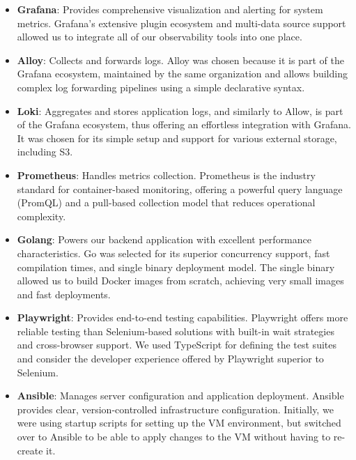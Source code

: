 \begin{itemize}
    \item \textbf{Grafana}: Provides comprehensive visualization and alerting for system metrics. Grafana's extensive plugin ecosystem and multi-data source support allowed us to integrate all of our observability tools into one place.

    \item \textbf{Alloy}: Collects and forwards logs. Alloy was chosen because it is part of the Grafana ecosystem, maintained by the same organization and allows building complex log forwarding pipelines using a simple declarative syntax.

    \item \textbf{Loki}: Aggregates and stores application logs, and similarly to Allow, is part of the Grafana ecosystem, thus offering an effortless integration with Grafana. It was chosen for its simple setup and support for various external storage, including S3.

    \item \textbf{Prometheus}: Handles metrics collection. Prometheus is the industry standard for container-based monitoring, offering a powerful query language (PromQL) and a pull-based collection model that reduces operational complexity.

    \item \textbf{Golang}: Powers our backend application with excellent performance characteristics. Go was selected for its superior concurrency support, fast compilation times, and single binary deployment model. The single binary allowed us to build Docker images from scratch, achieving very small images and fast deployments.

    \item \textbf{Playwright}: Provides end-to-end testing capabilities. Playwright offers more reliable testing than Selenium-based solutions with built-in wait strategies and cross-browser support. We used TypeScript for defining the test suites and consider the developer experience offered by Playwright superior to Selenium.

    \item \textbf{Ansible}: Manages server configuration and application deployment. Ansible provides clear, version-controlled infrastructure configuration. Initially, we were using startup scripts for setting up the VM environment, but switched over to Ansible to be able to apply changes to the VM without having to re-create it. 

\end{itemize}
